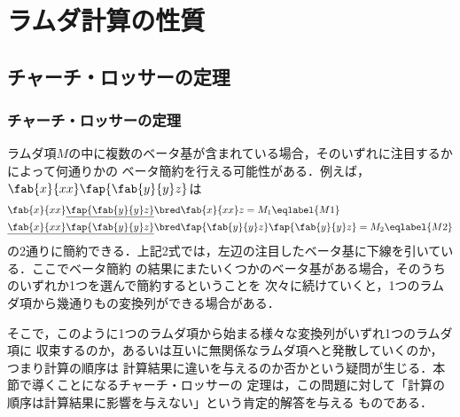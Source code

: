 \documentclass[uplatex,dvipdfmx,report,fleqn]{jsbook}
\begin{document}
\chapter{ラムダ計算の性質}

\begin{abstract}

\end{abstract}

\section{チャーチ・ロッサーの定理}

\subsection{チャーチ・ロッサーの定理}

ラムダ項$M$の中に複数のベータ基が含まれている場合，そのいずれに注目するかによって何通りかの
ベータ簡約を行える可能性がある．例えば，$\fab{x}{xx}\fap{\fab{y}{y}z}$は
%
\begin{align}
\fab{x}{xx}\underline{\fap{\fab{y}{y}z}} &\bred \fab{x}{xx}z = M_1 \eqlabel{M1} \\
\underline{\fab{x}{xx}\fap{\fab{y}{y}z}} &\bred \fap{\fab{y}{y}z}\fap{\fab{y}{y}z} = M_2
\eqlabel{M2}
\end{align}
%
の2通りに簡約できる．上記2式では，左辺の注目したベータ基に下線を引いている．ここでベータ簡約
の結果にまたいくつかのベータ基がある場合，そのうちのいずれか1つを選んで簡約するということを
次々に続けていくと，1つのラムダ項から幾通りもの変換列ができる場合がある．

そこで，このように1つのラムダ項から始まる様々な変換列がいずれ1つのラムダ項に
収束するのか，あるいは互いに無関係なラムダ項へと発散していくのか，つまり計算の順序は
計算結果に違いを与えるのか否かという疑問が生じる．本節で導くことになるチャーチ・ロッサーの
定理は，この問題に対して「計算の順序は計算結果に影響を与えない」という肯定的解答を与える
ものである．
\end{document}
